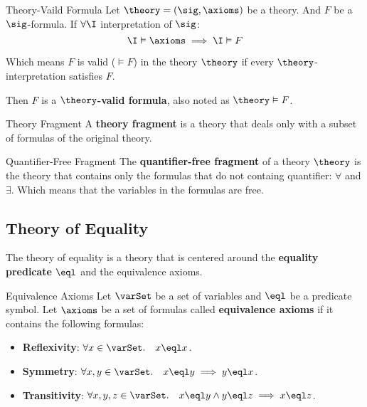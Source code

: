 \begin{definition}{Theory-Vaild Formula}
    Let $\theory = (\sig,\axioms)$ be a theory. And $F$ be a $\sig$-formula.
    If $\forall \I$ interpretation of $\sig$:
    \begin{equation*}
        \I \vDash \axioms \implies \I \vDash F
    \end{equation*}

    Which means $F$ is valid ($\vDash F$) in the theory $\theory$ if 
    every $\theory$-interpretation satisfies $F$.

    Then $F$ is a \textbf{$\theory$-valid formula}, also 
    noted as $\theory \vDash F$. 
\end{definition}

\begin{definition}{Theory Fragment}
    A \textbf{theory fragment} is a theory that deals only with a subset 
    of formulas of the original theory.
\end{definition}

\begin{definition}{Quantifier-Free Fragment}
    The \textbf{quantifier-free fragment} of a theory $\theory$ is the theory 
    that contains only the formulas that do not containg quantifier: 
    $\forall$ and $\exists$.
    Which means that the variables in the formulas are free.
\end{definition}

\subsection{Theory of Equality}
\label{subsec:Theory of Equality}

The theory of equality is a theory that is centered around 
the \textbf{equality predicate} $\eql$ and the equivalence
axioms.

\begin{definition}{Equivalence Axioms}
    Let $\varSet$ be a set of variables and $\eql$ be a predicate symbol.
    Let $\axioms$ be a set of formulas called \textbf{equivalence axioms} if 
    it contains the following formulas:
    \begin{itemize}
        \item \textbf{Reflexivity}: $\forall x \in \varSet. \quad x \eql x$.
        \item \textbf{Symmetry}: $\forall x,y \in \varSet. \quad x \eql y \implies y \eql x$.
        \item \textbf{Transitivity}: 
        $\forall x,y,z \in \varSet. \quad x \eql y \land y \eql z \implies x \eql z$.
    \end{itemize}
\end{definition}

